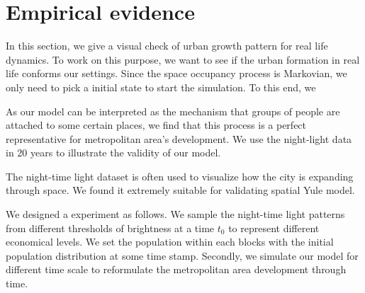 \documentclass[aps,prl]{revtex4-1}
\begin{document}
\section{Empirical evidence}

In this section, we give a visual check of urban growth pattern for real life dynamics. To work on this purpose, we want to see if the urban formation in real life conforms our settings. Since the space occupancy process is Markovian, we only need to pick a initial state to start the simulation. To this end, we 

As our model can be interpreted as the mechanism that groups of people are attached to some certain places, we find that this process is a perfect representative for metropolitan area's development. We use the night-light data in 20 years to illustrate the validity of our model. 

The night-time light dataset is often used to visualize how the city is expanding through space. We found it extremely suitable for validating spatial Yule model. 

We designed a experiment as follows. We sample the night-time light patterns from different thresholds of brightness at a time $t_0$ to represent different economical levels. We set the population within each blocks with the initial population distribution at some time stamp. Secondly, we simulate our model for different time scale to reformulate the metropolitan area development through time. 



    
\end{document}
